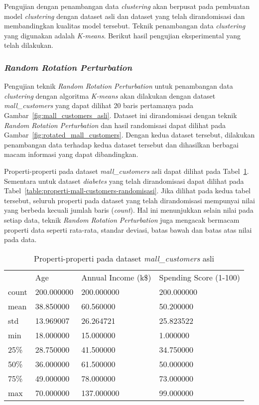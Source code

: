 Pengujian dengan penambangan data \textit{clustering} akan berpusat pada pembuatan model \textit{clustering} dengan dataset asli dan dataset yang telah dirandomisasi dan membandingkan kualitas model tersebut. Teknik penambangan data \textit{clustering} yang digunakan adalah \textit{K-means}. Berikut hasil pengujian eksperimental yang telah dilakukan.

\subsubsection{\textit{Random Rotation Perturbation}}
\label{sec:pengujian-clustering-rrp}

Pengujian teknik \textit{Random Rotation Perturbation} untuk penambangan data \textit{clustering} dengan algoritma \textit{K-means} akan dilakukan dengan dataset \textit{mall\_customers} yang dapat dilihat 20 baris pertamanya pada Gambar~\ref{fig:mall_customers_asli}. Dataset ini dirandomisasi dengan teknik \textit{Random Rotation Perturbation} dan hasil randomisasi dapat dilihat pada Gambar~\ref{fig:rotated_mall_customers}. Dengan kedua dataset tersebut, dilakukan penambangan data terhadap kedua dataset tersebut dan dihasilkan berbagai macam informasi yang dapat dibandingkan.

Properti-properti pada dataset \textit{mall\_customers} asli dapat dilihat pada Tabel~\ref{table:properti-mall-customers-asli}. Sementara untuk dataset \textit{diabetes} yang telah dirandomisasi dapat dilihat pada Tabel~\ref{table:properti-mall-customers-randomisasi}. Jika dilihat pada kedua tabel tersebut, seluruh properti pada dataset yang telah dirandomisasi mempunyai nilai yang berbeda kecuali jumlah baris (\textit{count}). Hal ini menunjukkan selain nilai pada setiap data, teknik \textit{Random Rotation Perturbation} juga mengacak bermacam properti data seperti rata-rata, standar deviasi, batas bawah dan batas atas nilai pada data.

\begin{table}
	\centering
	\caption{Properti-properti pada dataset \textit{mall\_customers} asli}
	\begin{tabular}{l|lll}
		\hline
		& Age & Annual Income (k\$) & Spending Score (1-100) \\ 
 count& 200.000000 & 200.000000 & 200.000000 \\
 mean & 38.850000 & 60.560000 & 50.200000 \\
 std & 13.969007 & 26.264721 & 25.823522 \\
 min & 18.000000 & 15.000000 & 1.000000 \\
 25\% & 28.750000 & 41.500000 & 34.750000 \\
 50\% & 36.000000 & 61.500000 & 50.000000 \\
 75\% & 49.000000 & 78.000000 & 73.000000 \\
 max & 70.000000 & 137.000000 & 99.000000 \\
		\hline
	\end{tabular}
	\label{table:properti-mall-customers-asli}
\end{table}

